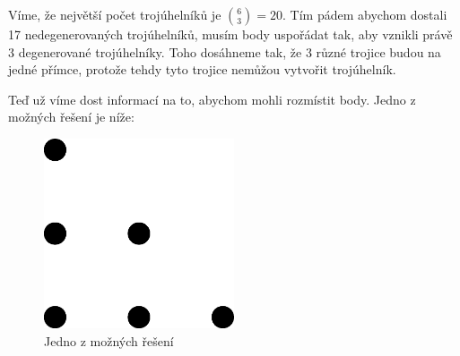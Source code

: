 \documentclass{fkssolpub}
\author{Ondřej Sedláček}
\begin{document}
Víme, že největší počet trojúhelníků je $\binom{6}{3} = 20$. Tím pádem abychom dostali 17 nedegenerovaných trojúhelníků, musím body uspořádat tak, aby vznikli právě 3 degenerované trojúhelníky. Toho dosáhneme tak, že 3 různé trojice budou na jedné přímce, protože tehdy tyto trojice nemůžou vytvořit trojúhelník.

Teď už víme dost informací na to, abychom mohli rozmístit body. Jedno z možných řešení je níže:

\begin{figure}[h!]
	\begin{center}
		\includegraphics[width=0.50\textwidth]{1-fig.eps}
	\end{center}
	\caption{Jedno z možných řešení}
	\label{fig:}
\end{figure}
\end{document}
